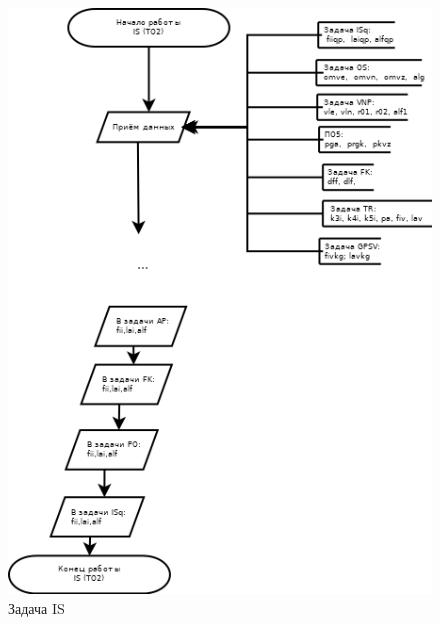 \begin{figure}[H]
    \centering
    \includegraphics[width=0.75\linewidth]{images/IS_simple.png}
    \caption{Задача IS}
    \label{fig:IS}
\end{figure}


